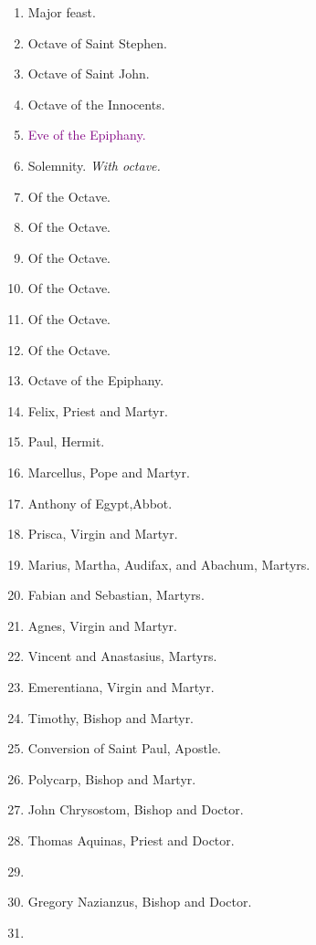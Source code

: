 	\begin{enumerate}
		\item {} Major feast.
		\item Octave of Saint Stephen. 
		\item Octave of Saint John. 
		\item Octave of the Innocents. 
		\item \textcolor{purple}{Eve of the Epiphany.} 
		\item {} Solemnity. \textit{With octave.}
		\item Of the Octave. 
		\item Of the Octave. 
		\item Of the Octave. 
		\item Of the Octave. 
		\item Of the Octave. 
		\item Of the Octave. 
		\item Octave of the Epiphany. 
		\item Felix, Priest and Martyr. 
		\item Paul, Hermit. 
		\item Marcellus, Pope and Martyr. 
		\item Anthony of Egypt,Abbot. 
		\item Prisca, Virgin and Martyr. 
		\item Marius, Martha, Audifax, and Abachum, Martyrs. 
		\item Fabian and Sebastian, Martyrs. 
		\item Agnes, Virgin and Martyr. 
		\item Vincent and Anastasius, Martyrs. 
		\item Emerentiana, Virgin and Martyr. 
		\item Timothy, Bishop and Martyr. 
		\item Conversion of Saint Paul, Apostle. 
		\item Polycarp, Bishop and Martyr. 
		\item John Chrysostom, Bishop and Doctor. 
		\item Thomas Aquinas, Priest and Doctor. 
		\item %
		\item Gregory Nazianzus,  Bishop and Doctor. 
		\item %
	\end{enumerate}

